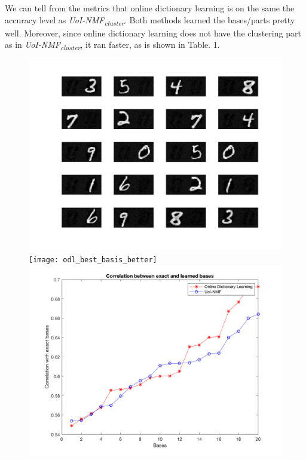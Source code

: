 \documentclass[conference]{IEEEtran}
\begin{document}
We can tell from the metrics that online dictionary learning is on the same the accuracy level as \textit{UoI-NMF\textsubscript{cluster}}. Both methods learned the bases/parts pretty well. Moreover, since online dictionary learning does not have the clustering part as in \textit{UoI-NMF\textsubscript{cluster}}, it ran faster, as is shown in Table. 1.

\begin{figure}[!htb]
\centering
{}
  \includegraphics[width=\linewidth]{uoi_best_basis}
\endminipage\hfill
{}
  \texttt{[image: odl\_best\_basis\_better]}
\endminipage\hfill
{}%
  \includegraphics[width=\linewidth]{corr_2in1}

\end{figure}
\end{document}
